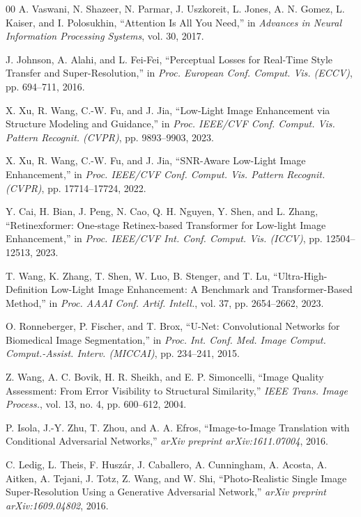 \documentclass[conference]{IEEEtran}
\begin{document}
\begin{thebibliography}{00}
A. Vaswani, N. Shazeer, N. Parmar, J. Uszkoreit, L. Jones, A. N. Gomez, L. Kaiser, and I. Polosukhin, ``Attention Is All You Need,'' in \textit{Advances in Neural Information Processing Systems}, vol. 30, 2017. 

J. Johnson, A. Alahi, and L. Fei-Fei, ``Perceptual Losses for Real-Time Style Transfer and Super-Resolution,'' in \textit{Proc. European Conf. Comput. Vis. (ECCV)}, pp. 694--711, 2016. 

X. Xu, R. Wang, C.-W. Fu, and J. Jia, ``Low-Light Image Enhancement via Structure Modeling and Guidance,'' in \textit{Proc. IEEE/CVF Conf. Comput. Vis. Pattern Recognit. (CVPR)}, pp. 9893--9903, 2023. 

X. Xu, R. Wang, C.-W. Fu, and J. Jia, ``SNR-Aware Low-Light Image Enhancement,'' in \textit{Proc. IEEE/CVF Conf. Comput. Vis. Pattern Recognit. (CVPR)}, pp. 17714--17724, 2022.

Y. Cai, H. Bian, J. Peng, N. Cao, Q. H. Nguyen, Y. Shen, and L. Zhang, ``Retinexformer: One-stage Retinex-based Transformer for Low-light Image Enhancement,'' in \textit{Proc. IEEE/CVF Int. Conf. Comput. Vis. (ICCV)}, pp. 12504--12513, 2023.

T. Wang, K. Zhang, T. Shen, W. Luo, B. Stenger, and T. Lu, ``Ultra-High-Definition Low-Light Image Enhancement: A Benchmark and Transformer-Based Method,'' in \textit{Proc. AAAI Conf. Artif. Intell.}, vol. 37, pp. 2654--2662, 2023.

O. Ronneberger, P. Fischer, and T. Brox, ``U-Net: Convolutional Networks for Biomedical Image Segmentation,'' in \textit{Proc. Int. Conf. Med. Image Comput. Comput.-Assist. Interv. (MICCAI)}, pp. 234--241, 2015.

Z. Wang, A. C. Bovik, H. R. Sheikh, and E. P. Simoncelli, ``Image Quality Assessment: From Error Visibility to Structural Similarity,'' \textit{IEEE Trans. Image Process.}, vol. 13, no. 4, pp. 600--612, 2004.

P. Isola, J.-Y. Zhu, T. Zhou, and A. A. Efros, ``Image-to-Image Translation with Conditional Adversarial Networks,'' \textit{arXiv preprint arXiv:1611.07004}, 2016.

C. Ledig, L. Theis, F. Husz{\'a}r, J. Caballero, A. Cunningham, A. Acosta, A. Aitken, A. Tejani, J. Totz, Z. Wang, and W. Shi, ``Photo-Realistic Single Image Super-Resolution Using a Generative Adversarial Network,'' \textit{arXiv preprint arXiv:1609.04802}, 2016.


\end{thebibliography}
\end{document}
